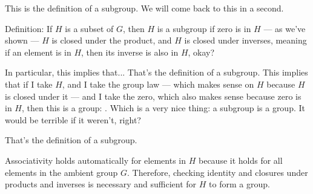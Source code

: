 \begin{speech}[00:25:18 - 00:26:29]
This is the definition of a subgroup. We will come back to this in a second.

Definition:  If $H$ is a subset of $G$,  then $H$ is a subgroup  if zero is in $H$  --- as we've shown --- $H$ is closed under the product,  and $H$ is closed under inverses,  meaning if an element is in $H$, then its inverse is also in $H$, okay?

In particular, this implies that... That's the definition of a subgroup. This implies that if I take $H$, and I take the group law --- which makes sense on $H$ because $H$ is closed under it --- and I take the zero, which also makes sense because zero is in $H$, then this is a group: . Which is a very nice thing: a subgroup is a group. It would be terrible if it weren't, right?

That's the definition of a subgroup.
\end{speech}

\begin{content}

\begin{steps}
Associativity holds automatically for elements in $H$ because it holds for all elements in the ambient group $G$. Therefore, checking identity and closures under products and inverses is necessary and sufficient for $H$ to form a group.
\end{steps}
\end{content}

